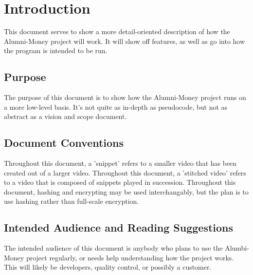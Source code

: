 \section{Introduction}

This document serves to show a more detail-oriented description of how the Alumni-Money project will work.
It will show off features, as well as go into how the program is intended to be run.

\subsection{Purpose}

The purpose of this document is to show how the Alumni-Money project runs on a more low-level basis.
It's not quite as in-depth as pseudocode, but not as abstract as a vision and scope document.

\subsection{Document Conventions}
Throughout this document, a 'snippet' refers to a smaller video that has been created out of a larger video.
Throughout this document, a 'stitched video' refers to a video that is composed of snippets played in succession.
Throughout this document, hashing and encrypting may be used interchangably, but the plan is to use hashing rather than full-scale encryption.

\subsection{Intended Audience and Reading Suggestions}
The intended audience of this document is anybody who plans to use the Alumbi-Money project regularly, or needs help understanding
 how the project works. This will likely be developers, quality control, or possibly a customer.
 
